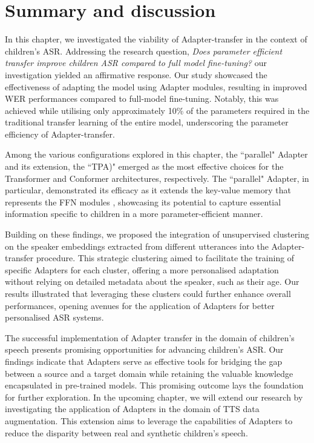     
\section{Summary and discussion}
In this chapter, we investigated the viability of Adapter-transfer in the context of children's \ac{ASR}. Addressing the research question, \textit{Does parameter efficient transfer improve children \ac{ASR} compared to full model fine-tuning?} our investigation yielded an affirmative response. Our study showcased the effectiveness of adapting the model using Adapter modules, resulting in improved \ac{WER} performances compared to full-model fine-tuning. Notably, this was achieved while utilising only approximately 10\% of the parameters required in the traditional transfer learning of the entire model, underscoring the parameter efficiency of Adapter-transfer.
 
Among the various configurations explored in this chapter, the ``parallel" Adapter and its extension, the ``\ac{TPA})" emerged as the most effective choices for the Transformer and Conformer architectures, respectively. The ``parallel" Adapter, in particular, demonstrated its efficacy as it extends the key-value memory that represents the \ac{FFN} modules \cite{geva2020transformer}, showcasing its potential to capture essential information specific to children in a more parameter-efficient manner.

Building on these findings, we proposed the integration of unsupervised clustering on the speaker embeddings extracted from different utterances into the Adapter-transfer procedure. This strategic clustering aimed to facilitate the training of specific Adapters for each cluster, offering a more personalised adaptation without relying on detailed metadata about the speaker, such as their age. Our results illustrated that leveraging these clusters could further enhance overall performances, opening avenues for the application of Adapters for better personalised \ac{ASR} systems.


The successful implementation of Adapter transfer in the domain of children's speech presents promising opportunities for advancing children's \ac{ASR}. Our findings indicate that Adapters serve as effective tools for bridging the gap between a source and a target domain while retaining the valuable knowledge encapsulated in pre-trained models. This promising outcome lays the foundation for further exploration. In the upcoming chapter, we will extend our research by investigating the application of Adapters in the domain of \ac{TTS} data augmentation. This extension aims to leverage the capabilities of Adapters to reduce the disparity between real and synthetic children's speech.


